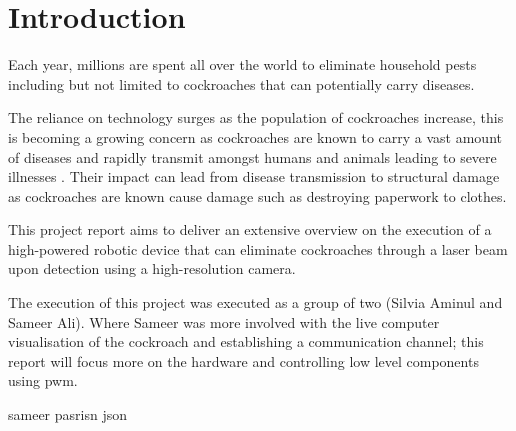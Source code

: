 \documentclass[11pt]{article}
\begin{document}
	
	
	\newpage
	\section{Introduction}
	
	Each year, millions are spent all over the world to eliminate household pests including but not limited to cockroaches that can potentially carry diseases.
	
	The reliance on technology surges as the population of cockroaches increase, this is becoming a growing  concern as cockroaches are known to carry a vast amount of diseases and rapidly transmit amongst humans and animals leading to severe illnesses . Their impact can lead from disease transmission to structural damage as cockroaches are known cause damage such as destroying paperwork to clothes.
	
	


	This project report aims to deliver an extensive overview on the execution of a high-powered robotic device that can eliminate cockroaches  through a laser beam upon detection using a high-resolution camera. 
	
	
	
	
	

	
	
	
	
	The execution of this project was executed as a group of two (Silvia Aminul and Sameer Ali). Where Sameer was more involved with the live computer visualisation of the cockroach and establishing a communication channel; this report will focus more on the hardware and controlling low level components using pwm.
	

	
	
	sameer 
	pasrisn json 
	
	
	
	
\end{document}
